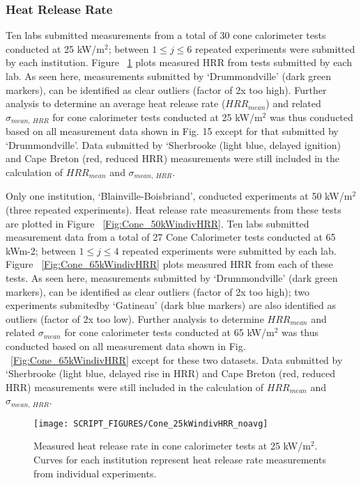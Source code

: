 \documentclass{book}
\begin{document}
\subsubsection{Heat Release Rate}

Ten labs submitted measurements from a total of 30 cone calorimeter tests conducted at 25 kW/m$^2$; between $1\le j\le6$ repeated experiments were submitted by each institution. Figure ~\ref{Fig:Cone_25kWindivHRR} plots measured HRR from tests submitted by each lab. As seen here, measurements submitted by ‘Drummondville’ (dark green markers), can be identified as clear outliers (factor of 2x too high). Further analysis to determine an average heat release rate ($HRR_{mean}$) and related $\sigma_{mean,\ HRR}$ for cone calorimeter tests conducted at 25 kW/m$^2$ was thus conducted based on all measurement data shown in Fig. 15 except for that submitted by ‘Drummondville’. Data submitted by ‘Sherbrooke (light blue, delayed ignition) and Cape Breton (red, reduced HRR) measurements were still included in the calculation of  $HRR_{mean}$ and $\sigma_{mean,\ HRR}$.

Only one institution, ‘Blainville-Boisbriand’, conducted experiments at 50 kW/m$^2$ (three repeated experiments). Heat release rate measurements from these tests are plotted in Figure ~\ref{Fig:Cone_50kWindivHRR}.
Ten labs submitted measurement data from a total of 27 Cone Calorimeter tests conducted at 65 kWm-2; between $1\le j\le4$ repeated experiments were submitted by each lab. Figure ~\ref{Fig:Cone_65kWindivHRR} plots measured HRR from each of these tests. As seen here, measurements submitted by ‘Drummondville’ (dark green markers), can be identified as clear outliers (factor of 2x too high); two experiments submitedby ‘Gatineau’ (dark blue markers) are also identified as outliers (factor of 2x too low). Further analysis to determine $HRR_{mean}$ and related $\sigma_{mean}$ for cone calorimeter tests conducted at 65 kW/m$^2$ was thus conducted based on all measurement data shown in Fig. ~\ref{Fig:Cone_65kWindivHRR} except for these two datasets. Data submitted by ‘Sherbrooke (light blue, delayed rise in HRR) and Cape Breton (red, reduced HRR) measurements were still included in the calculation of  $HRR_{mean}$ and $\sigma_{mean,\ HRR}$.

\begin{figure}
  \centering
  \texttt{[image: SCRIPT\_FIGURES/Cone\_25kWindivHRR\_noavg]}
  \caption{Measured heat release rate in cone calorimeter tests at 25 kW/m$^2$. Curves for each institution represent heat release rate measurements from individual experiments.}
  \label{Fig:Cone_25kWindivHRR}
\end{figure}
\end{document}
